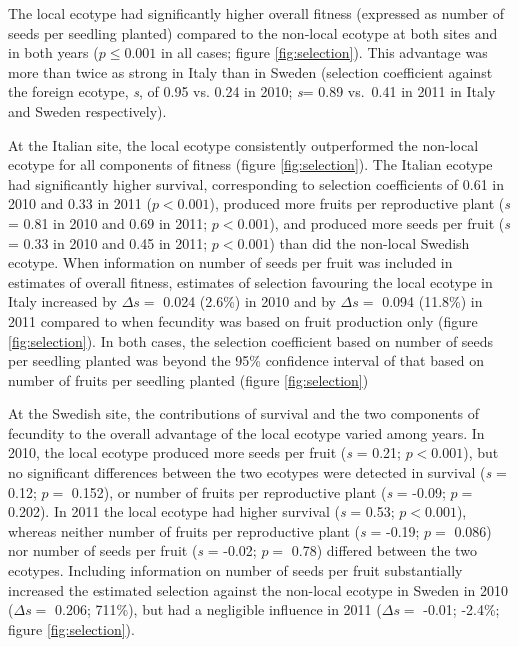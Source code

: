 \documentclass[12pt,]{article}
\begin{document}
The local ecotype had significantly higher overall fitness (expressed as number of seeds per seedling planted) compared to the non-local ecotype at both sites and in both years (\(p \leq 0.001\) in all cases; figure \ref{fig:selection}).
This advantage was more than twice as strong in Italy than in Sweden
(selection coefficient against the foreign ecotype, \emph{s}, of
0.95
vs.
0.24
in 2010;
\emph{s}=
0.89
vs.~0.41
in 2011 in Italy and Sweden respectively).

At the Italian site, the local ecotype consistently outperformed the non-local ecotype for all components of fitness (figure \ref{fig:selection}).
The Italian ecotype had significantly higher survival, corresponding to selection coefficients of
0.61 in 2010 and
0.33 in 2011
(\(p < 0.001\)),
produced more fruits per reproductive plant
(\emph{s} =
0.81 in 2010 and
0.69 in 2011;
\(p < 0.001\)),
and produced more seeds per fruit
(\emph{s} =
0.33 in 2010 and
0.45 in 2011;
\(p < 0.001\))
than did the non-local Swedish ecotype.
When information on number of seeds per fruit was included in estimates of overall fitness, estimates of selection favouring the local ecotype in Italy increased by
\(\Delta s=\)
0.024
(2.6\%)
in 2010 and by \(\Delta s=\)
0.094
(11.8\%)
in 2011 compared to when fecundity was based on fruit production only (figure \ref{fig:selection}).
In both cases, the selection coefficient based on number of seeds per seedling planted was beyond the 95\% confidence interval of that based on number of fruits per seedling planted (figure \ref{fig:selection})

At the Swedish site, the contributions of survival and the two components of fecundity to the overall advantage of the local ecotype varied among years.
In 2010, the local ecotype produced more seeds per fruit
(\emph{s} = 0.21;
\(p < 0.001\)),
but no significant differences between the two ecotypes were detected in survival
(\emph{s} = 0.12;
\(p=\) 0.152),
or number of fruits per reproductive plant
(\emph{s} = -0.09;
\(p=\) 0.202).
In 2011 the local ecotype had higher survival
(\emph{s} = 0.53;
\(p < 0.001\)),
whereas neither number of fruits per reproductive plant
(\emph{s} = -0.19;
\(p=\) 0.086)
nor number of seeds per fruit
(\emph{s} = -0.02;
\(p=\) 0.78)
differed between the two ecotypes.
Including information on number of seeds per fruit substantially increased the estimated selection against the non-local ecotype in Sweden in 2010
(\(\Delta s=\)
0.206;
711\%),
but had a negligible influence in 2011
(\(\Delta s=\)
-0.01;
-2.4\%;
figure \ref{fig:selection}).
\end{document}
